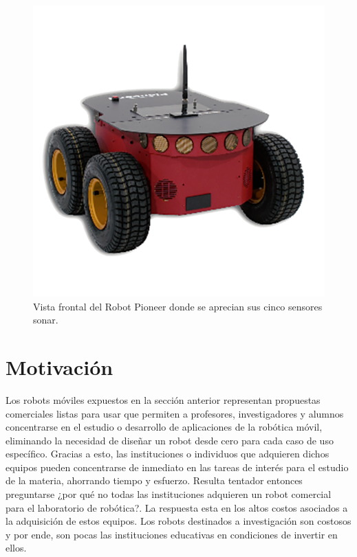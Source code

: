 \begin{figure}[ht]
	\centering
	\includegraphics[scale=1.]{./Figures/pioneer.png}
	\caption{Vista frontal del Robot Pioneer donde se aprecian sus cinco sensores sonar.\protect\footnotemark}
	\label{fig:robotPioneer}
\end{figure}



\section{Motivación}

Los robots móviles expuestos en la sección anterior representan propuestas comerciales listas para usar que permiten a profesores, investigadores y alumnos concentrarse en el estudio o desarrollo de aplicaciones de la robótica móvil, eliminando la necesidad de diseñar un robot desde cero para cada caso de uso específico. Gracias a esto, las instituciones o individuos que adquieren dichos equipos pueden concentrarse de inmediato en las tareas de interés para el estudio de la materia, ahorrando tiempo y esfuerzo.\newline
Resulta tentador entonces preguntarse ¿por qué no todas las instituciones adquieren un robot comercial para el laboratorio de robótica?. La respuesta esta en los altos costos asociados a la adquisición de estos equipos. Los robots destinados a investigación son costosos y por ende, son pocas las instituciones educativas en condiciones de invertir en ellos.


